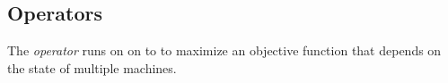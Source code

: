 \subsection{Operators}\label{operator}\label{operators}

The \emph{operator} runs  on  on  to to maximize an objective function that depends on the state of multiple machines. 